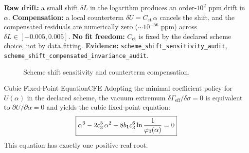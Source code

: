 \begin{tcolorbox}[colback=yellow!5, colframe=yellow!60!black,
    title={\textbf{Scheme shifts and counterterm compensation}}, fonttitle=\bfseries\small]
\textbf{Raw drift:} a small shift $\delta L$ in the logarithm produces an order-$10^2$ ppm drift in $\alpha$.
\textbf{Compensation:} a local counterterm $\delta U = C_{\mathrm{ct}}\,\alpha$ cancels the shift,
and the compensated residuals are numerically zero ($\sim 10^{-56}$ ppm) across $\delta L\in[-0.005,0.005]$.
\textbf{No fit freedom:} $C_{\mathrm{ct}}$ is fixed by the declared scheme choice, not by data fitting.
\textbf{Evidence:} \texttt{scheme\_shift\_sensitivity\_audit}, \texttt{scheme\_shift\_compensated\_invariance\_audit}.
\end{tcolorbox}

\begin{figure}[H]
\centering
{}
\caption{Scheme shift sensitivity and counterterm compensation.}
\label{fig:scheme-shift}
\end{figure}

\begin{theorem}{Cubic Fixed-Point Equation}{CFE}
Adopting the minimal coefficient policy for $U(\alpha)$ in the declared scheme, the
vacuum extremum $\delta\Gamma_{\mathrm{eff}}/\delta\sigma=0$ is equivalent to
$\partial U/\partial\alpha = 0$ and yields the cubic fixed-point equation:
\begin{equation}
    \boxed{\alpha^3 - 2c_3^3\,\alpha^2 - 8b_1c_3^6\ln\frac{1}{\varphi_0(\alpha)} = 0}
    \label{eq:CFE}
\end{equation}
This equation has exactly one positive real root.
\end{theorem}

